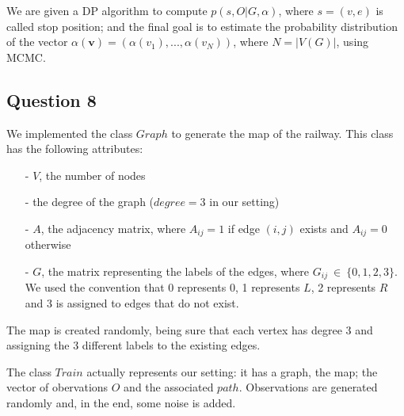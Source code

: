 \documentclass[]{article}
\begin{document}
We are given a DP algorithm to compute $p(s,O|G,\alpha)$, where $s=(v,e)$ is called stop position; and the final goal is to estimate the probability distribution of the vector $\alpha(\mathbf{v}) = (\alpha(v_1), ..., \alpha(v_N))$,  where $ N=|V(G)| $, using MCMC.

\subsection*{Question 8}
We implemented the class $Graph$ to generate the map of the railway. This class has the following attributes:
\begin{enumerate}
	\item[-] $V$, the number of nodes 
	\item[-] the degree of the graph ($degree=3$ in our setting) 
	\item[-] $A$, the adjacency matrix, where $A_{ij}=1$ if edge $(i,j)$ exists and $A_{ij}=0$ otherwise
	\item[-] $G$, the matrix representing the labels of the edges, where $G_{ij} \ \in \ \{ 0,1,2,3\} $. We used the convention that 0 represents 0, 1 represents $L$, 2 represents $R$ and 3 is assigned to edges that do not exist.
\end{enumerate} 
The map is created randomly, being sure that each vertex has degree 3 and assigning the 3 different labels to the existing edges.

The class $Train$ actually represents our setting: it has a graph, the map; the vector of obervations $O$ and the associated $path$. Observations are generated randomly and, in the end, some noise is added.
\end{document}
